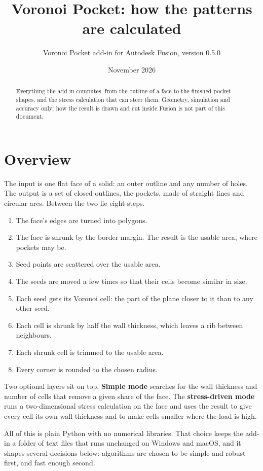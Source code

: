 \documentclass[11pt,a4paper]{article}
\title{Voronoi Pocket: how the patterns are calculated}
\author{Voronoi Pocket add-in for Autodesk Fusion, version 0.5.0}
\date{November 2026}
\begin{document}
\maketitle

\begin{abstract}
\noindent Everything the add-in computes, from the outline of a face to the finished pocket shapes, and the stress calculation that can steer them. Geometry, simulation and accuracy only: how the result is drawn and cut inside Fusion is not part of this document.
\end{abstract}

\tableofcontents
\newpage
\section{Overview}
 

The input is one flat face of a solid: an outer outline and any number of holes. The output is a set of closed outlines, the pockets, made of straight lines and circular arcs. Between the two lie eight steps. 
\begin{enumerate}
 
\item The face's edges are turned into polygons. 
\item The face is shrunk by the border margin. The result is the usable area, where pockets may be. 
\item Seed points are scattered over the usable area. 
\item The seeds are moved a few times so that their cells become similar in size. 
\item Each seed gets its Voronoi cell: the part of the plane closer to it than to any other seed. 
\item Each cell is shrunk by half the wall thickness, which leaves a rib between neighbours. 
\item Each shrunk cell is trimmed to the usable area. 
\item Every corner is rounded to the chosen radius. 
\end{enumerate}
 

Two optional layers sit on top. \textbf{Simple mode} searches for the wall thickness and number of cells that remove a given share of the face. The \textbf{stress-driven mode} runs a two-dimensional stress calculation on the face and uses the result to give every cell its own wall thickness and to make cells smaller where the load is high. 

All of this is plain Python with no numerical libraries. That choice keeps the add-in a folder of text files that runs unchanged on Windows and macOS, and it shapes several decisions below: algorithms are chosen to be simple and robust first, and fast enough second. 
\end{document}
